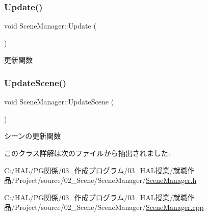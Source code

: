 \mbox{\label{class_scene_manager_a63dcf65832d6a2c190bf496d9a3b00a3}} 
\subsubsection{\texorpdfstring{Update()}{Update()}}
{\footnotesize\ttfamily void Scene\+Manager\+::\+Update (\begin{DoxyParamCaption}{ }\end{DoxyParamCaption})}



更新関数 

\mbox{\label{class_scene_manager_a493bc0d65558ce004f6f248a185ba956}} 
\subsubsection{\texorpdfstring{Update\+Scene()}{UpdateScene()}}
{\footnotesize\ttfamily void Scene\+Manager\+::\+Update\+Scene (\begin{DoxyParamCaption}{ }\end{DoxyParamCaption})}



シーンの更新関数 



このクラス詳解は次のファイルから抽出されました\+:\begin{DoxyCompactItemize}
\item 
C\+:/\+H\+A\+L/\+P\+G関係/03\+\_\+作成プログラム/03\+\_\+\+H\+A\+L授業/就職作品/\+Project/source/02\+\_\+\+Scene/\+Scene\+Manager/\mbox{\hyperlink{_scene_manager_8h}{Scene\+Manager.\+h}}\item 
C\+:/\+H\+A\+L/\+P\+G関係/03\+\_\+作成プログラム/03\+\_\+\+H\+A\+L授業/就職作品/\+Project/source/02\+\_\+\+Scene/\+Scene\+Manager/\mbox{\hyperlink{_scene_manager_8cpp}{Scene\+Manager.\+cpp}}\end{DoxyCompactItemize}
